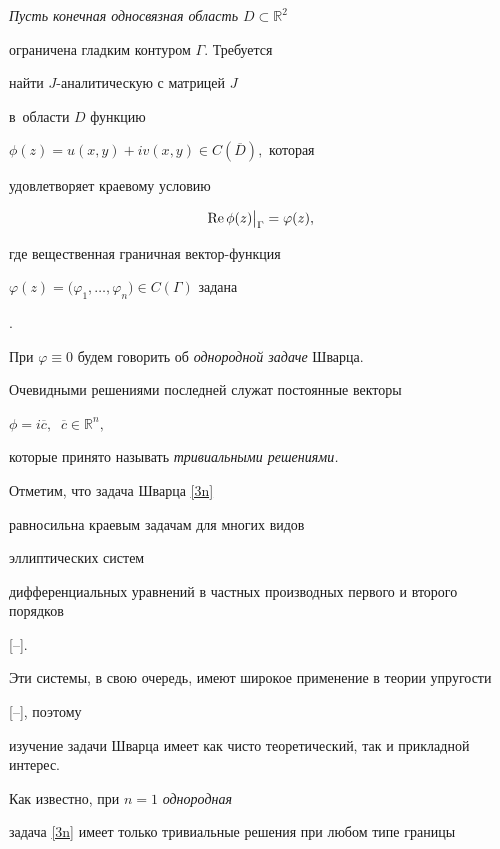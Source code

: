  {\it Пусть конечная односвязная область $ D\subset\mathbb{R}^2$

 ограничена  гладким контуром $ \Gamma.$ Требуется

найти $J$-аналитическую с матрицей $J$

 в~области $D$ функцию

 $\phi(z)=u(x,y)+iv(x,y)\in C(\overline{D}),$ которая

 удовлетворяет краевому  условию

\begin{equation}

{\rm Re}\,\phi(z)\bigr|_{\Gamma}=\varphi(z),

\label{3n}

\end{equation}

 где вещественная граничная вектор-функция

 $\varphi(z)=\bigr(\varphi_1,\ldots,\varphi_n\bigr)\in C(\Gamma)$ задана}.



\smallskip



При $\varphi\equiv 0$ будем говорить об {\it однородной  задаче} Шварца.

Очевидными решениями последней служат постоянные векторы

$\phi=i\overline{c},~$ $\overline{c}\in \mathbb{R}^{n},$

 которые принято называть  {\it тривиальными решениями.}



Отметим, что   задача Шварца  \eqref{3n}

равносильна краевым задачам для многих видов

эллиптических систем

дифференциальных уравнений в частных производных первого и второго порядков

[--].

 Эти системы, в свою очередь,  имеют широкое применение в теории упругости

 [--], поэтому

изучение задачи Шварца имеет как чисто теоретический, так и прикладной интерес.





Как известно, при $n=1$ {\it однородная }

задача \eqref{3n} имеет только тривиальные решения при любом типе границы

